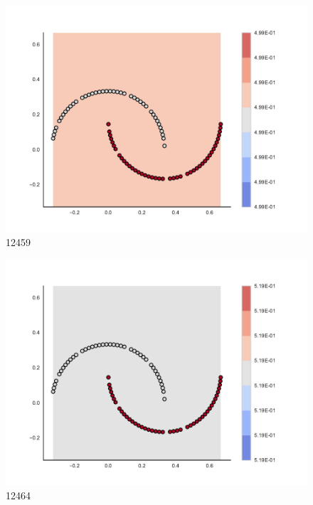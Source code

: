 \begin{subfigure}[b]{0.09\textwidth}
    \includegraphics[clip, trim=2.35cm 1.75cm 4.5cm 0cm,width=\textwidth]{img/convergence/12459.pdf}
    \caption{12459}
    \label{fig:convergence_12459}
\end{subfigure}
%
\begin{subfigure}[b]{0.09\textwidth}
    \includegraphics[clip, trim=2.35cm 1.75cm 4.5cm 0cm,width=\textwidth]{img/convergence/12464.pdf}
    \caption{12464}
    \label{fig:convergence_12464}
\end{subfigure}
%
